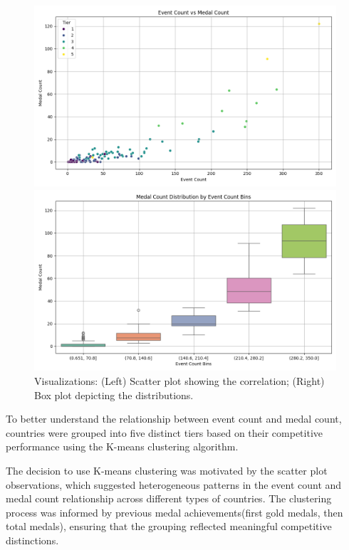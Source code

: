 \documentclass{mcmthesis}
\begin{document}
    
\begin{figure}[!h]
    \begin{minipage}[t]{0.5\textwidth}
        \centering
        \includegraphics[width=1\textwidth]{pics/event_count_vs_medal_count.png}
    \end{minipage}
    \begin{minipage}[t]{0.5\textwidth}
        \centering
        \includegraphics[width=1\textwidth]{pics/medal_count_distribution_by_event_count_bins.png}
    \end{minipage}
    \caption{Visualizations: (Left) Scatter plot showing the correlation; 
    (Right) Box plot depicting the distributions.}
\end{figure}

    To better understand the relationship between event count and medal count, countries were grouped into five distinct tiers based on their competitive performance using the K-means clustering algorithm. 

    The decision to use K-means clustering was motivated by the scatter plot observations, which suggested heterogeneous patterns in the event count and medal count relationship across different types of countries. The clustering process was informed by previous medal achievements(first gold medals, then total medals), ensuring that the grouping reflected meaningful competitive distinctions.
    
\end{document}

